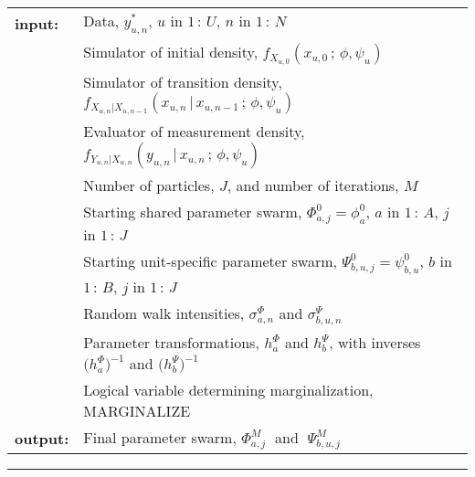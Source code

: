 \begin{algorithm}[t!]
  \caption{
    \texttt{mif2$\big($pp, Nmif\,=\,$M$, Np\,=\,$J$,
start{\,=\,}$(\phi^0_{a},\psi^0_{b,u})$,
rw\_sd{\,=\,}$(\sigma^\Phi_{a,n},\sigma^\Psi_{b,u,n})$,
cooling.factor.50{\,=\,}$\rho^{50}\big)$}, where \texttt{pp} is a \texttt{panelPomp} object containing data and defined \texttt{rprocess}, \texttt{dmeasure}, \texttt{rinit} and \texttt{partrans} components.
    \label{alg:pif}
    }
\noindent\begin{tabular}{ll}
{\bf input:}\rule[-1.5mm]{0mm}{6mm}
& Data, $y_{u,n}^*$, $u$ in $1\,{:}\,U$, $n$ in $1\,{:}\,N$\\
& Simulator of initial density, $f_{X_{u,0}}(x_{u,0} {\,;\,} \phi,\psi_{u})$ \\
& Simulator of transition density, $f_{X_{u,n}|X_{u,n-1}}(x_{u,n}\,|\, x_{u,n-1}{\,;\,} \phi,\psi_{u})$ \\
& Evaluator of measurement density, $f_{Y_{u,n}|X_{u,n}}(y_{u,n}\,|\, x_{u,n}{\,;\,}\phi,\psi_{u})$ \\
& Number of particles, $J$, and number of iterations, $M$\\
& Starting shared parameter swarm, $\Phi^0_{a,j}=\phi^0_{a}$, $a$ in $1\,{:}\,A$, $j$ in $1\,{:}\,J$\\
& Starting unit-specific parameter swarm, $\Psi^0_{b,u,j}=\psi^0_{b,u}$,  $b$ in  $1\,{:}\,B$, $j$ in $1\,{:}\,J$\\
& Random walk intensities,
$\sigma^\Phi_{a,n}$ and $\sigma^\Psi_{b,u,n}$ \\
& Parameter transformations, $h^{\Phi}_{a}$ and $h^{\Psi}_{b}$, with inverses
 $\big(h^{\Phi}_{a}\big)^{-1}$ and $\big(h^{\Psi}_{b}\big)^{-1}$
\\
&Logical variable determining marginalization, MARGINALIZE
\\
{\bf output:}\rule[-1.5mm]{0mm}{6mm}
& Final parameter swarm, $\Phi^M_{a,j}\;$ and $\;\Psi^M_{b,u,j}$
\rule[-2mm]{0mm}{5mm}
\end{tabular}
\hrule


\end{algorithm}
